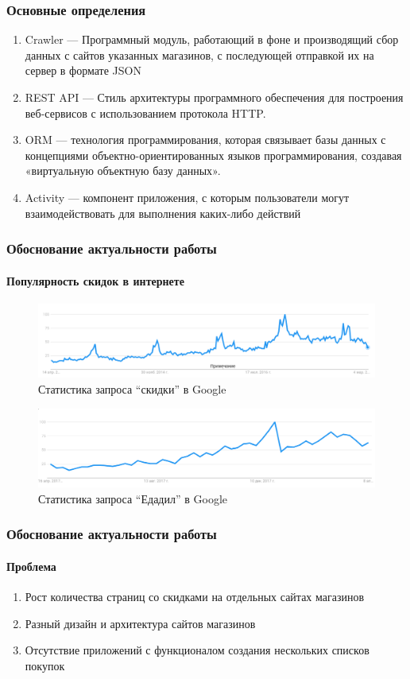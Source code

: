 \documentclass{beamer}
\begin{document}
\begin{frame}
\frametitle{Основные определения}
	\begin{enumerate}
		\item Crawler --- Программный модуль, работающий в фоне и производящий
            сбор данных с сайтов указанных магазинов, с последующей отправкой
            их на сервер в формате JSON
		\item REST API --- Стиль архитектуры программного обеспечения для построения веб-сервисов с использованием протокола HTTP.
    \item ORM --- технология программирования, которая связывает базы
      данных с концепциями объектно-ориентированных языков программирования,
      создавая «виртуальную объектную базу данных».
    \item Activity --- компонент приложения, с
      которым пользователи могут взаимодействовать для выполнения
      каких-либо действий
	\end{enumerate}
\end{frame}

\begin{frame}[c]
    \frametitle{Обоснование актуальности работы}
    \framesubtitle{Популярность скидок в интернете}
    \begin{figure}
        \includegraphics[width=\columnwidth]{trend.png}
        \caption{Статистика запроса ``скидки'' в Google}
    \end{figure}
    \begin{figure}
        \includegraphics[width=\columnwidth]{trend_edadeal.png}
        \caption{Статистика запроса ``Едадил'' в Google}
    \end{figure}
\end{frame}

\begin{frame}
    \frametitle{Обоснование актуальности работы}
    \framesubtitle{Проблема}
    \begin{enumerate}
        \item Рост количества страниц со скидками на отдельных сайтах магазинов
        \item Разный дизайн и архитектура сайтов магазинов
        \item Отсутствие приложений с функционалом создания нескольких списков покупок
    \end{enumerate}
\end{frame}
\end{document}
